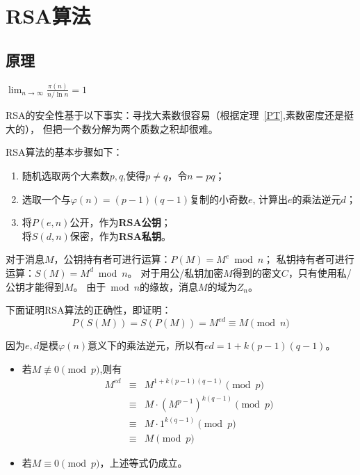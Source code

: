 \section{RSA算法}
\subsection{原理}
\begin{theorem}[素数定理]\label{PT}
	$\lim_{n\rightarrow\infty}\frac{\pi(n)}{n/\ln n}=1$
\end{theorem}
RSA的安全性基于以下事实：寻找大素数很容易（根据定理~\ref{PT},素数密度还是挺大的），
但把一个数分解为两个质数之积却很难。

RSA算法的基本步骤如下：
\begin{enumerate}
	\item 随机选取两个大素数$p,q$,使得$p\neq q$，令$n=pq$；
	\item 选取一个与$\varphi(n)=(p-1)(q-1)$复制的小奇数$e$,
	      计算出$e$的乘法逆元$d$；
	\item 将$P(e,n)$公开，作为{\bfseries RSA公钥}；\\
	      将$S(d,n)$保密，作为{\bfseries RSA私钥}。
\end{enumerate}

对于消息$M$，公钥持有者可进行运算：$P(M)=M^e \bmod n$；
私钥持有者可进行运算：$S(M)=M^d \bmod n$。
对于用公/私钥加密$M$得到的密文$C$，只有使用私/公钥才能得到$M$。
由于$\bmod n$的缘故，消息$M$的域为$Z_n$。

下面证明RSA算法的正确性，即证明：
\begin{displaymath}
	P(S(M))=S(P(M))=M^{ed}\equiv M \pmod{n}
\end{displaymath}

因为$e,d$是模$\varphi(n)$意义下的乘法逆元，所以有$ed=1+k(p-1)(q-1)$。

\begin{itemize}
	\item 若$M\not\equiv 0 \pmod{p}$,则有
	      \begin{eqnarray*}
		      M^{ed}&\equiv& M^{1+k(p-1)(q-1)} \pmod{p}\\
		      &\equiv& M\cdot (M^{p-1})^{k(q-1)} \pmod{p}\\
		      &\equiv& M\cdot 1^{k(q-1)} \pmod{p}\\
		      &\equiv& M \pmod{p}
	      \end{eqnarray*}
	\item 若$M\equiv 0 \pmod{p}$，上述等式仍成立。
\end{itemize}

